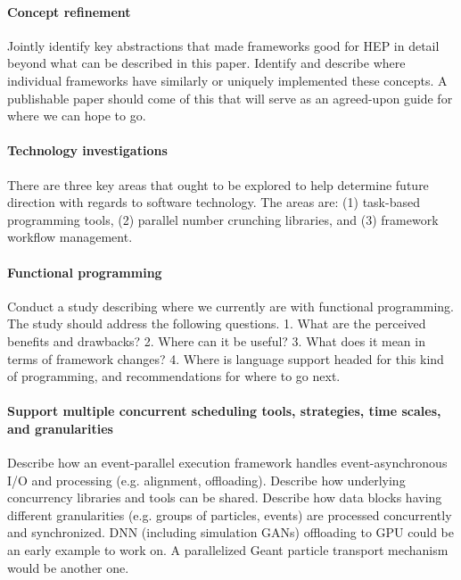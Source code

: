 \documentclass[12pt,a4paper]{article}
\begin{document}
\paragraph{Concept refinement} Jointly identify key abstractions that
made frameworks good for HEP in detail beyond what can be described in
this paper. Identify and describe where individual frameworks have
similarly or uniquely implemented these concepts. A publishable paper
should come of this that will serve as an agreed-upon guide for where
we can hope to go.

\paragraph{Technology investigations} There are three key areas that
ought to be explored to help determine future direction with regards
to software technology. The areas are: (1) task-based programming
tools, (2) parallel number crunching libraries, and (3) framework
workflow management.

\paragraph{Functional programming} Conduct a study describing where we
currently are with functional programming. The study should address
the following questions. 1. What are the perceived benefits and
drawbacks?  2. Where can it be useful? 3. What does it mean in terms
of framework changes? 4. Where is language support headed for this
kind of programming, and recommendations for where to go next.

\paragraph{Support multiple concurrent scheduling tools, strategies,
  time scales, and granularities} Describe how an event-parallel
execution framework handles event-asynchronous I/O and processing
(e.g. alignment, offloading). Describe how underlying concurrency
libraries and tools can be shared. Describe how data blocks having
different granularities (e.g.  groups of particles, events) are
processed concurrently and synchronized. DNN (including simulation
GANs) offloading to GPU could be an early example to work on. A
parallelized Geant particle transport mechanism would be another one.
\end{document}
